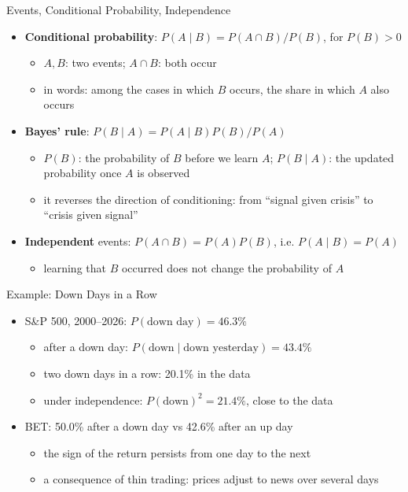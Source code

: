 \begin{frame}{Events, Conditional Probability, Independence}
\itemsize{\footnotesize}
\begin{itemize}
    \item \textbf{Conditional probability}: $P(A \mid B) = P(A \cap B)/P(B)$, for $P(B) > 0$
    \begin{itemize}
        \item $A, B$: two events; $A \cap B$: both occur
        \item in words: among the cases in which $B$ occurs, the share in which $A$ also occurs
    \end{itemize}
    \item \textbf{Bayes' rule}: $P(B \mid A) = P(A \mid B)P(B)/P(A)$
    \begin{itemize}
        \item $P(B)$: the probability of $B$ before we learn $A$; $P(B \mid A)$: the updated probability once $A$ is observed
        \item it reverses the direction of conditioning: from ``signal given crisis'' to ``crisis given signal''
    \end{itemize}
    \item \textbf{Independent} events: $P(A \cap B) = P(A)P(B)$, i.e. $P(A \mid B) = P(A)$
    \begin{itemize}
        \item learning that $B$ occurred does not change the probability of $A$
    \end{itemize}
\end{itemize}
\end{frame}

\begin{frame}{Example: Down Days in a Row}
\itemsize{\small}
\begin{itemize}
    \item S\&P 500, 2000--2026: $P(\text{down day}) = 46.3\%$
    \begin{itemize}
        \item after a down day: $P(\text{down} \mid \text{down yesterday}) = 43.4\%$
        \item two down days in a row: 20.1\% in the data
        \item under independence: $P(\text{down})^2 = 21.4\%$, close to the data
    \end{itemize}
    \item BET: 50.0\% after a down day vs 42.6\% after an up day
    \begin{itemize}
        \item the sign of the return persists from one day to the next
        \item a consequence of thin trading: prices adjust to news over several days
    \end{itemize}
\end{itemize}
\end{frame}

